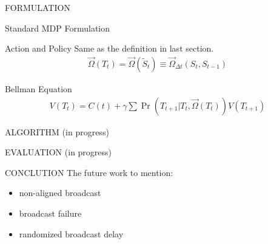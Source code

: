 \documentclass[10pt, conference, letterpaper]{IEEEtran}
\begin{document}
\begin{section}{FORMULATION}
\begin{subsection}{Standard MDP Formulation}
            \begin{subsubsection}{Action and Policy}
                Same as the definition in last section.
                \begin{align}
                    \vec{\Omega}(T_t) = \vec{\Omega}(\tilde{S}_t) \equiv \vec{\Omega}_{\Delta{t}}(S_t, S_{t-1})
                \end{align}
            \end{subsubsection}

            \begin{subsubsection}{Bellman Equation}
                \begin{align}
                    V(T_t) = C(t) + \gamma \sum \Pr(T_{t+1}|T_{t}, \vec{\Omega}(T_t)) V(T_{t+1})
                \end{align}
            \end{subsubsection}
        \end{subsection}
        
    \end{section}

    \begin{section}{ALGORITHM}
        \label{sec:algorithm}
        (in progress)
    \end{section}

    \begin{section}{EVALUATION}
        \label{sec:evaluation}
        (in progress)
    \end{section}

    \begin{section}{CONCLUTION}
        \label{sec:conclusion}
        The future work to mention:
        \begin{itemize}
            \item non-aligned broadcast
            \item broadcast failure
            \item randomized broadcast delay
        \end{itemize}
    \end{section}

    
    
\end{document}
